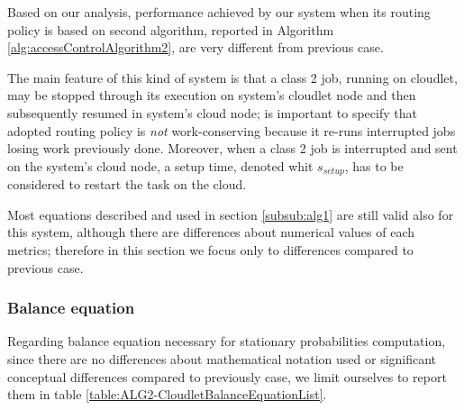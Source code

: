 \documentclass[10pt,a4paper]{article}
\begin{document}
Based on our analysis, performance achieved by our system when its routing policy is based on second algorithm, reported in Algorithm \ref{alg:accessControlAlgorithm2}, are very different from previous case. 

The main feature of this kind of system is that a class 2 job, running on cloudlet, may be stopped through its execution on system's cloudlet node and then subsequently resumed in system's cloud node; is important to specify that adopted routing policy is \textit{not} work-conserving because it re-runs interrupted jobs losing work previously done. Moreover, when a class 2 job is interrupted and sent on the system's cloud node, a setup time, denoted whit $s_{setup}$, has to be considered to restart the task on the cloud. 

Most equations described and used in section \ref{subsub:alg1} are still valid also for this system, although there are differences about numerical values of each metrics; therefore in this section we focus only to differences compared to previous case.

\subsubsection{Balance equation}

Regarding balance equation necessary for stationary probabilities computation, since there are no differences about mathematical notation used or significant conceptual differences compared to previously case, we limit ourselves to report them in table \ref{table:ALG2-CloudletBalanceEquationList}.
\end{document}
